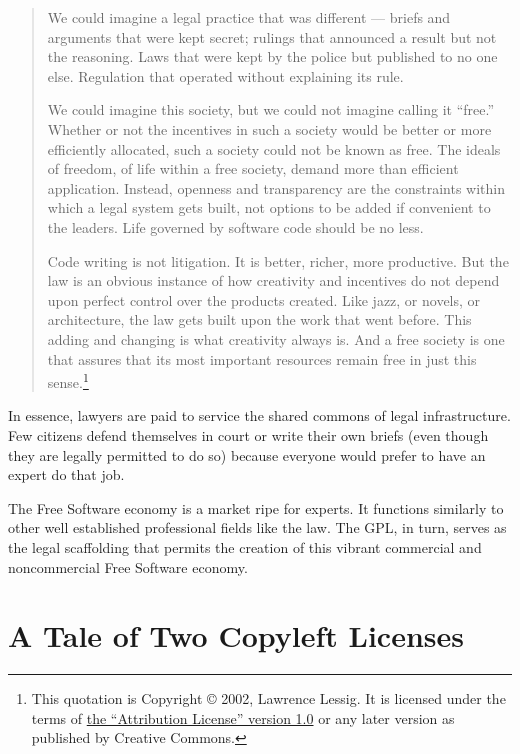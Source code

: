 \begin{quotation}
We could imagine a legal practice that was different --- briefs and
arguments that were kept secret; rulings that announced a result but not
the reasoning. Laws that were kept by the police but published to no one
else. Regulation that operated without explaining its rule.

We could imagine this society, but we could not imagine calling it
``free.''  Whether or not the incentives in such a society would be better
or more efficiently allocated, such a society could not be known as free.
The ideals of freedom, of life within a free society, demand more than
efficient application.  Instead, openness and transparency are the
constraints within which a legal system gets built, not options to be
added if convenient to the leaders.  Life governed by software code should
be no less.

Code writing is not litigation.  It is better, richer, more
productive.  But the law is an obvious instance of how creativity and
incentives do not depend upon perfect control over the products
created.  Like jazz, or novels, or architecture, the law gets built
upon the work that went before. This adding and changing is what
creativity always is.  And a free society is one that assures that its
most important resources remain free in just this sense.\footnote{This
quotation is Copyright \copyright{} 2002, Lawrence Lessig. It is
licensed under the terms of
\href{http://creativecommons.org/licenses/by/1.0/}{the ``Attribution
License'' version 1.0} or any later version as published by Creative
Commons.}
\end{quotation}

In essence, lawyers are paid to service the shared commons of legal
infrastructure.  Few citizens defend themselves in court or write their
own briefs (even though they are legally permitted to do so) because
everyone would prefer to have an expert do that job.

The Free Software economy is a market ripe for experts.  It
functions similarly to other well established professional fields like the
law. The GPL, in turn, serves as the legal scaffolding that permits the
creation of this vibrant commercial and noncommercial Free Software
economy.

\chapter{A Tale of Two Copyleft Licenses}
\label{tale-of-two-copylefts}

